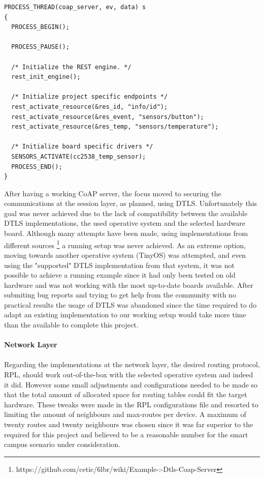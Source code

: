 \begin{lstlisting}[caption={CoAP Resources Activation}]
PROCESS_THREAD(coap_server, ev, data) s
{
  PROCESS_BEGIN();

  PROCESS_PAUSE();

  /* Initialize the REST engine. */
  rest_init_engine();

  /* Initialize project specific endpoints */
  rest_activate_resource(&res_id, "info/id");
  rest_activate_resource(&res_event, "sensors/button");
  rest_activate_resource(&res_temp, "sensors/temperature");

  /* Initialize board specific drivers */
  SENSORS_ACTIVATE(cc2538_temp_sensor);
  PROCESS_END();
}
\end{lstlisting}

After having a working \gls{CoAP} server, the focus moved to securing the communications at the session layer, as planned, using \gls{DTLS}. Unfortunately this goal was never achieved due to the lack of compatibility between the available \gls{DTLS} implementations, the used operative system and the selected hardware board. Although many attempts have been made, using implementations from different sources \footnote{https://github.com/cetic/6lbr/wiki/Example-:-Dtls-Coap-Server} a running setup was never achieved. As an extreme option, moving towards another operative system (TinyOS) was attempted, and even using the "supported" \gls{DTLS} implementation from that system, it was not possible to achieve a running example since it had only been tested on old hardware and was not working with the most up-to-date boards available. After submiting bug reports and trying to get help from the community with no practical results the usage of \gls{DTLS} was abandoned since the time required to do adapt an existing implementation to our working setup would take more time than the available to complete this project.

\paragraph{\textbf{Network Layer}}
\paragraph{}

Regarding the implementations at the network layer, the desired routing protocol, \gls{RPL}, should work out-of-the-box with the selected operative system and indeed it did. However some small adjustments and configurations needed to be made so that the total amount of allocated space for routing tables could fit the target hardware. These tweaks were made in the \gls{RPL} configurations file and resorted to limiting the amount of neighbours and max-routes per device. A maximum of twenty routes and twenty neighbours was chosen since it was far superior to the required for this project and believed to be a reasonable number for the smart campus scenario under consideration.

